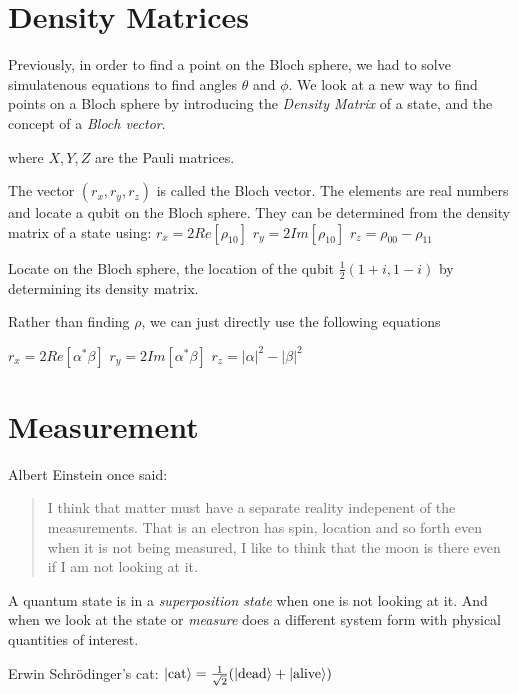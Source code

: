 \section{Density Matrices}

Previously, in order to find a point on the Bloch sphere, 
we had to solve simulatenous equations to find angles $\theta$ and 
$\phi$. We look at a new way to find points on a Bloch sphere 
by introducing the \textit{Density Matrix} of a state, 
and the concept of a \textit{Bloch vector}. 


\frmrule 

where $X,Y,Z$ are the Pauli matrices. 

The vector $(r_x,r_y,r_z)$ is called the Bloch vector. 
The elements are real numbers and locate a qubit on the Bloch sphere. 
They can be determined from the density matrix of a state using:
$r_x = 2Re[\rho_{10}]$
$r_y = 2Im[\rho_{10}]$
$r_z = \rho_{00} - \rho_{11}$

\frmrule 

\begin{example}
Locate on the Bloch sphere, the location 
of the qubit $\frac{1}{2}(1+i, 1-i)$ by determining its density matrix.
\end{example}

Rather than finding  $\rho$, we can just directly use 
the following equations 

$r_x = 2Re[\alpha^{*}\beta]$
$r_y = 2Im[\alpha^{*}\beta]$
$r_z = |\alpha|^2 - |\beta|^2$	

\section{Measurement}

Albert Einstein once said:
\begin{quote}
I think that matter must have a 
separate reality indepenent of the measurements. 
That is an electron has spin, location and so forth even when 
it is not being measured, I like to think that the moon is there even if 
I am not looking at it.
\end{quote}

A quantum state is in a \textit{superposition state} when 
one is not looking at it. And when we look at the state 
or \textit{measure} does a different system form with 
physical quantities of interest. 


Erwin Schr\"{o}dinger's cat: 
$\left|\text{cat}\right\rangle = \frac{1}{\sqrt{2}} (\left|\text{dead}\right\rangle + \left|\text{alive}\right\rangle)$